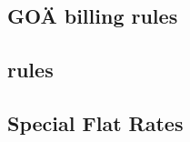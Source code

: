 \subsection{GOÄ billing rules}\label{subsec:goa-billing-rules}

\subsection{\MJ rules}\label{subsec:multiplier-justification-rules}

\subsection{Special Flat Rates}\label{subsec:special-flat-rates}


